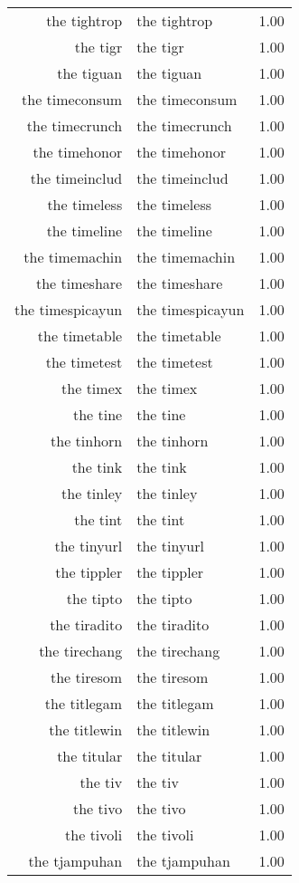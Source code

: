 \begin{table}[ht]
\begin{tabular}{rlr}
  the tightrop & the tightrop & 1.00 \\ 
  the tigr & the tigr & 1.00 \\ 
  the tiguan & the tiguan & 1.00 \\ 
  the timeconsum & the timeconsum & 1.00 \\ 
  the timecrunch & the timecrunch & 1.00 \\ 
  the timehonor & the timehonor & 1.00 \\ 
  the timeinclud & the timeinclud & 1.00 \\ 
  the timeless & the timeless & 1.00 \\ 
  the timeline & the timeline & 1.00 \\ 
  the timemachin & the timemachin & 1.00 \\ 
  the timeshare & the timeshare & 1.00 \\ 
  the timespicayun & the timespicayun & 1.00 \\ 
  the timetable & the timetable & 1.00 \\ 
  the timetest & the timetest & 1.00 \\ 
  the timex & the timex & 1.00 \\ 
  the tine & the tine & 1.00 \\ 
  the tinhorn & the tinhorn & 1.00 \\ 
  the tink & the tink & 1.00 \\ 
  the tinley & the tinley & 1.00 \\ 
  the tint & the tint & 1.00 \\ 
  the tinyurl & the tinyurl & 1.00 \\ 
  the tippler & the tippler & 1.00 \\ 
  the tipto & the tipto & 1.00 \\ 
  the tiradito & the tiradito & 1.00 \\ 
  the tirechang & the tirechang & 1.00 \\ 
  the tiresom & the tiresom & 1.00 \\ 
  the titlegam & the titlegam & 1.00 \\ 
  the titlewin & the titlewin & 1.00 \\ 
  the titular & the titular & 1.00 \\ 
  the tiv & the tiv & 1.00 \\ 
  the tivo & the tivo & 1.00 \\ 
  the tivoli & the tivoli & 1.00 \\ 
  the tjampuhan & the tjampuhan & 1.00 \\ 

\end{tabular}
\end{table}
